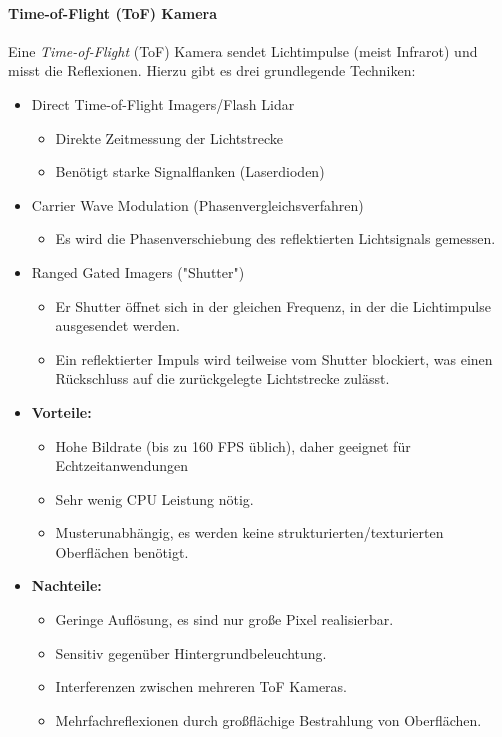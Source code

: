 				\paragraph{Time-of-Flight (ToF) Kamera}
					Eine \emph{Time-of-Flight} (ToF) Kamera sendet Lichtimpulse (meist Infrarot) und misst die Reflexionen. Hierzu gibt es drei grundlegende Techniken:
					\begin{itemize}
						\item Direct Time-of-Flight Imagers/Flash Lidar
							\begin{itemize}
								\item Direkte Zeitmessung der Lichtstrecke
								\item Benötigt starke Signalflanken (\zB Laserdioden)
							\end{itemize}
						\item Carrier Wave Modulation (Phasenvergleichsverfahren)
							\begin{itemize}
								\item Es wird die Phasenverschiebung des reflektierten Lichtsignals gemessen.
							\end{itemize}
						\item Ranged Gated Imagers ("Shutter")
							\begin{itemize}
								\item Er Shutter öffnet sich in der gleichen Frequenz, in der die Lichtimpulse ausgesendet werden.
								\item Ein reflektierter Impuls wird teilweise vom Shutter blockiert, was einen Rückschluss auf die zurückgelegte Lichtstrecke zulässt.
							\end{itemize}
					\end{itemize}

					\begin{itemize}
						\item \textbf{Vorteile:}
							\begin{itemize}
								\item Hohe Bildrate (bis zu \num{160} FPS üblich), daher geeignet für Echtzeitanwendungen
								\item Sehr wenig CPU Leistung nötig.
								\item Musterunabhängig, \dh es werden keine strukturierten/texturierten Oberflächen benötigt.
							\end{itemize}
						\item \textbf{Nachteile:}
							\begin{itemize}
								\item Geringe Auflösung, es sind nur große Pixel realisierbar.
								\item Sensitiv gegenüber Hintergrundbeleuchtung.
								\item Interferenzen zwischen mehreren ToF Kameras.
								\item Mehrfachreflexionen durch großflächige Bestrahlung von Oberflächen.
							\end{itemize}
					\end{itemize}

